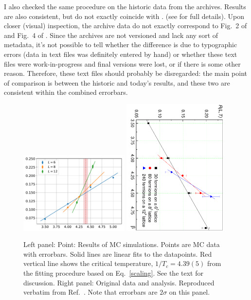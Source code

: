 I also checked the same procedure on the historic data from the archives.
Results are also consistent, but do not exactly coincide with \cite{NJP:2006}.
(see \cite{GH:2020} for full details). 
Upon closer (visual) inspection, the archive data do not exactly correspond to 
Fig.\ 2 of \cite{PRL:2006} and Fig.\ 4 of \cite{NJP:2006}. Since the archives
are not versioned and lack any sort of metadata, it's not possible to tell
whether the difference is due to typographic errors (data in text files was
definitely entered by hand) or whether these text files were work-in-progress
and final versions were lost, or if there is some other reason. Therefore,
these text files should probably be disregarded: the main point of comparison
is between the historic and today's results, and these two are consistent within
the combined errorbars.

\begin{figure}
\includegraphics[width=0.49\textwidth, keepaspectratio=True]{crossing_2.pdf}
\includegraphics[width=0.47\textwidth, keepaspectratio=True]{crossing.pdf}
%
\caption{Left panel: Point: Results of MC simulations. Points are MC data with
errorbars. Solid lines are linear fits to the datapoints. Red vertical line
shows the critical temperature, $1/T_c = 4.39(5)$ from the fitting procedure based
on Eq.\ \eqref{scaling}. See the text for discussion.
 Right panel: Original data and analysis. Reproduced
verbatim from Ref.\ \cite{PRL:2006}. Note that errorbars are $2\sigma$ on this
panel.
\label{fig:crossing}
}
\end{figure}



